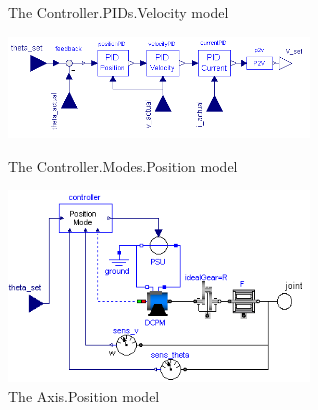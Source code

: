 \begin{figure}
	\caption{The Controller.PIDs.Velocity model}
	\label{fig:velocity-PID-modelica-model}
	\vspace{0.8cm}
	\includegraphics[width=8cm]{images/PositionMode}
	\caption{The Controller.Modes.Position model}
	\label{fig:position-mode-modelica-model}	
	\vspace{0.5cm}
	\includegraphics[width=8cm]{images/PositionAxis}
	\caption{The Axis.Position model}
	\label{fig:position-axis-modelica-model}
\end{figure}
